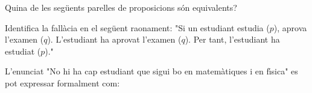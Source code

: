 \begin{enumerate}
\begin{enumerate}
{}
\end{enumerate}
\feedback

\pregunta Quina de les seg\"{u}ents parelles de proposicions s\'{o}n equivalents?

\begin{enumerate}
\end{enumerate}
\feedback

\pregunta Identifica la fal\textperiodcentered l\`{a}cia en el seg\"{u}ent
raonament: "Si un estudiant estudia ($p$), aprova l'examen ($q$). L'estudiant
ha aprovat l'examen ($q$). Per tant, l'estudiant ha estudiat ($p$)."

\begin{enumerate}
\end{enumerate}
\feedback

\pregunta L'enunciat "No hi ha cap estudiant que sigui bo en matem\`{a}tiques i en
f\'{\i}sica" es pot expressar formalment com:

\begin{enumerate}
\end{enumerate}
\feedback
\end{enumerate}